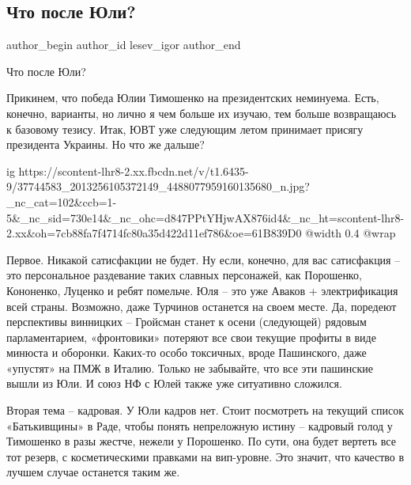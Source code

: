  
 
 
 
 
 
\subsection{Что после Юли?}
\label{sec:24_07_2018.fb.lesev_igor.1.chto_posle_juli}
 
\ifcmt
 author_begin
   author_id lesev_igor
 author_end
\fi

Что после Юли?

Прикинем, что победа Юлии Тимошенко на президентских неминуема. Есть, конечно,
варианты, но лично я чем больше их изучаю, тем больше возвращаюсь к базовому
тезису. Итак, ЮВТ уже следующим летом принимает присягу президента Украины. Но
что же дальше?

\ifcmt
  ig https://scontent-lhr8-2.xx.fbcdn.net/v/t1.6435-9/37744583_2013256105372149_4488077959160135680_n.jpg?_nc_cat=102&ccb=1-5&_nc_sid=730e14&_nc_ohc=d847PPtYHjwAX876id4&_nc_ht=scontent-lhr8-2.xx&oh=7cb88fa7f4714fc80a35d422d11ef786&oe=61B839D0
  @width 0.4
  @wrap 
\fi

Первое. Никакой сатисфакции не будет. Ну если, конечно, для вас сатисфакция –
это персональное раздевание таких славных персонажей, как Порошенко, Кононенко,
Луценко и ребят помельче. Юля – это уже Аваков + электрификация всей страны.
Возможно, даже Турчинов останется на своем месте. Да, поредеют перспективы
винницких – Гройсман станет к осени (следующей) рядовым парламентарием,
«фронтовики» потеряют все свои текущие профиты в виде минюста и оборонки.
Каких-то особо токсичных, вроде Пашинского, даже «упустят» на ПМЖ в Италию.
Только не забывайте, что все эти пашинские вышли из Юли. И союз НФ с Юлей также
уже ситуативно сложился.

Вторая тема – кадровая. У Юли кадров нет. Стоит посмотреть на текущий список
«Батькивщины» в Раде, чтобы понять непреложную истину – кадровый голод у
Тимошенко в разы жестче, нежели у Порошенко. По сути, она будет вертеть все тот
резерв, с косметическими правками на вип-уровне. Это значит, что качество в
лучшем случае останется таким же.

